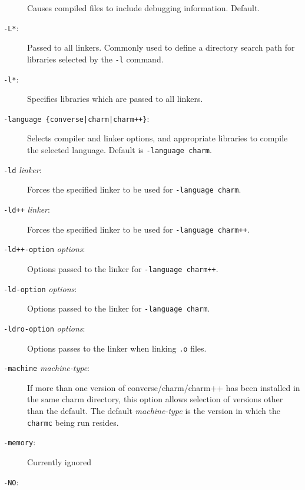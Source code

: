 \begin{description}
Causes compiled files to include debugging information. Default.

\item[{\tt -L*}:]

Passed to all linkers.  Commonly used to define a directory search
path for libraries selected by the {\tt -l} command.

\item[{\tt -l*}:]

Specifies libraries which are passed to all linkers.

\item[{\tt -language \{converse|charm|charm++\}}:]

Selects compiler and linker options, and appropriate libraries
to compile the selected language.  Default is {\tt -language charm}.

\item[{\tt -ld} {\em linker}:]

Forces the specified linker to be used for {\tt -language charm}.

\item[{\tt -ld++} {\em linker}:]

Forces the specified linker to be used for {\tt -language charm++}.

\item[{\tt -ld++-option} {\em options}:]

Options passed to the linker for {\tt -language charm++}.

\item[{\tt -ld-option} {\em options}:]

Options passed to the linker for {\tt -language charm}.

\item[{\tt -ldro-option} {\em options}:]

Options passes to the linker when linking {\tt .o} files.

\item[{\tt -machine} {\em machine-type}:]

If more than one version of converse/charm/charm++ has been installed
in the same charm directory, this option allows selection of versions
other than the default.  The default {\em machine-type} is the version
in which the {\tt charmc} being run resides.

\item[{\tt -memory}:]

Currently ignored

\item[{\tt -NO}:]


\end{description}
